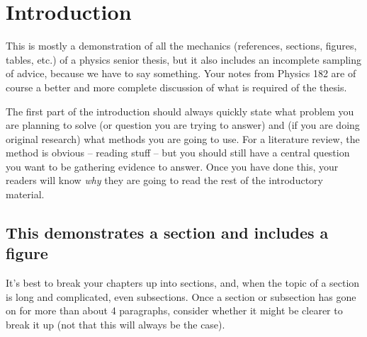 \documentclass[11pt]{ucscthesisbs}
\begin{document}

\chapter{Introduction}

This is mostly a demonstration of all the mechanics (references, sections, figures, tables, etc.) of a physics senior thesis, but it also includes an incomplete sampling of advice, because we have to say something.  Your notes from Physics 182 are of course a better and more complete discussion of what is required of the thesis.

The first part of the introduction should always quickly state what problem you are planning to solve (or question you are trying to answer) and (if you are doing original research) what methods you are going to use.  For a literature review, the method is obvious -- reading stuff -- but you should still have a central question you want to be gathering evidence to answer.  Once you have done this, your readers will know {\it why} they are going to read the rest of the introductory material.


\section{This demonstrates a section and includes a figure}

It's best to break your chapters up into sections, and, when the topic of a section is long and complicated, even subsections.  Once a section or subsection has gone on for more than about 4 paragraphs, consider whether it might be clearer to break it up (not that this will always be the case).
\end{document}
